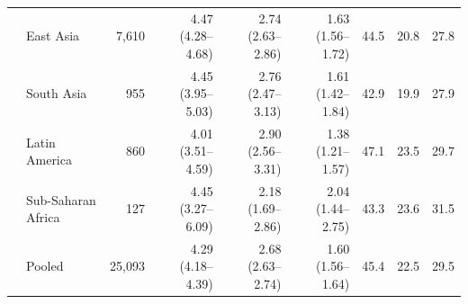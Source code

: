 \begin{tabular}{llrrrrrrr}
 & East Asia & 7,610 & 4.47 (4.28--4.68) & 2.74 (2.63--2.86) & 1.63 (1.56--1.72) & 44.5 & 20.8 & 27.8 \\
 & South Asia & 955 & 4.45 (3.95--5.03) & 2.76 (2.47--3.13) & 1.61 (1.42--1.84) & 42.9 & 19.9 & 27.9 \\
 & Latin America & 860 & 4.01 (3.51--4.59) & 2.90 (2.56--3.31) & 1.38 (1.21--1.57) & 47.1 & 23.5 & 29.7 \\
 & Sub-Saharan Africa & 127 & 4.45 (3.27--6.09) & 2.18 (1.69--2.86) & 2.04 (1.44--2.75) & 43.3 & 23.6 & 31.5 \\
 & Pooled & 25,093 & 4.29 (4.18--4.39) & 2.68 (2.63--2.74) & 1.60 (1.56--1.64) & 45.4 & 22.5 & 29.5 \\
\bottomrule
\end{tabular}
